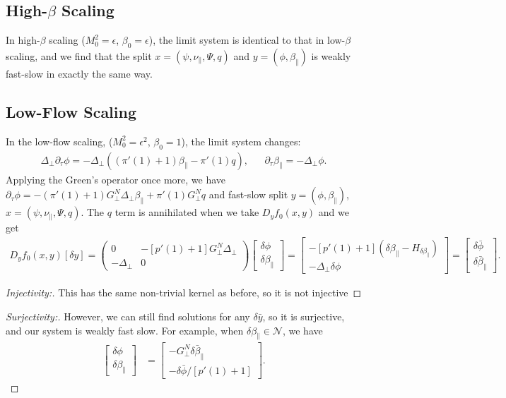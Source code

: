 \documentclass{article}
\newcommand{\para}{\parallel}
\newcommand{\ep}{\epsilon}
\newcommand{\lap}{\Delta_\perp}
\newcommand{\p}{\partial}
\newcommand{\GN}{G_\perp^N}
\newcommand{\pth} [1] {\left( #1 \right) }
\newcommand{\bmat} [1] {\begin{bmatrix} #1 \end{bmatrix}}
\newcommand{\pmat} [1] {\begin{pmatrix} #1 \end{pmatrix}}
\begin{document}
\subsection{High-$\beta$ Scaling}
In high-$\beta$ scaling ($M_0^2 = \ep$, $\beta_0=\ep$), the limit system is identical to that in low-$\beta$ scaling, and we find that the split $x=\pth{\psi,\nu_\para, \Psi, q}$ and $y=\pth{\phi,\beta_\para}$ is weakly fast-slow in exactly the same way.


\subsection{Low-Flow Scaling}
In the low-flow scaling, ($M_0^2=\ep^2$, $\beta_0=1$), the limit system changes: 
\begin{align*}
    \lap\p_\tau\phi = -\lap\pth{\pth{\pi'(1)+1}\beta_\para - \pi'(1)q}, && \p_\tau\beta_\para = -\lap\phi.
\end{align*}
Applying the Green's operator once more, we have $\p_\tau\phi = -\pth{\pi'(1)+1}\GN\lap\beta_\para + \pi'(1)\GN q$ and fast-slow split $y=\pth{\phi,\beta_\para}$, $x=\pth{\psi,\nu_\para, \Psi, q}$. The $q$ term is annihilated when we take $D_yf_0(x,y)$ and we get 
\begin{align}
    D_yf_0(x,y)[\delta y] = \pmat{0 & -[p'(1)+1] \GN \lap \\ -\lap & 0} \bmat{\delta \phi \\ \delta \beta_\para} = \bmat{-[p'(1)+1] \pth{\delta\beta_\para - H_{\delta\beta_\para}} \\ -\lap\delta\phi} = \bmat{\delta \bar{\phi} \\ \delta \bar{\beta}_\para}. 
\end{align}
\begin{proof} [Injectivity:]
    This has the same non-trivial kernel as before, so it is not injective
\end{proof}
\begin{proof} [Surjectivity:]
    However, we can still find solutions for any $\delta\bar{y}$, so it is surjective, and our system is weakly fast slow. For example, when $\delta\beta_\para\in\mathcal{N}$, we have 
    \begin{align}
    \bmat{\delta\phi \\ \delta\beta_\para} &= \bmat{-\GN \delta\bar{\beta}_\para \\ -\delta\bar{\phi} / [p'(1)+1]}.
    \end{align}
\end{proof}
\end{document}
